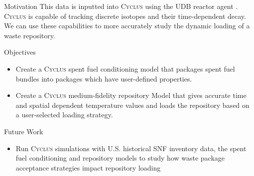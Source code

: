 \documentclass[final]{beamer}
\newlength{\onecolwid}
\newlength{\threecolwid}
\newcommand{\Cyclus}{\textsc{Cyclus}\xspace}%
\begin{document}
\begin{frame}[t]
\begin{columns}[t,totalwidth=\threecolwid]
\begin{column}{\onecolwid}
\begin{block}{Motivation}
This data is inputted into \Cyclus using the UDB reactor agent \cite{}. 
\Cyclus is capable of tracking discrete isotopes and their time-dependent decay. 
We can use these capabilities to more accurately study the dynamic loading 
of a waste repository. 

\end{block}

\begin{alertblock}{Objectives}
\begin{itemize}
        \item Create a \Cyclus spent fuel conditioning model that packages spent fuel 
        bundles into packages which have user-defined properties. 
		\item Create a \Cyclus medium-fidelity repository Model that gives accurate 
		time and spatial dependent temperature values and loads the repository
		based on a user-selected loading strategy. 
\end{itemize}

\end{alertblock}

\begin{alertblock}{Future Work }
\begin{itemize}
		\item Run \Cyclus simulations with U.S. historical SNF inventory data, the spent fuel conditioning 
		and repository models to study how waste package acceptance strategies impact repository loading
\end{itemize}

\end{alertblock}



\end{column}
\end{columns}
\end{frame}
\end{document}
